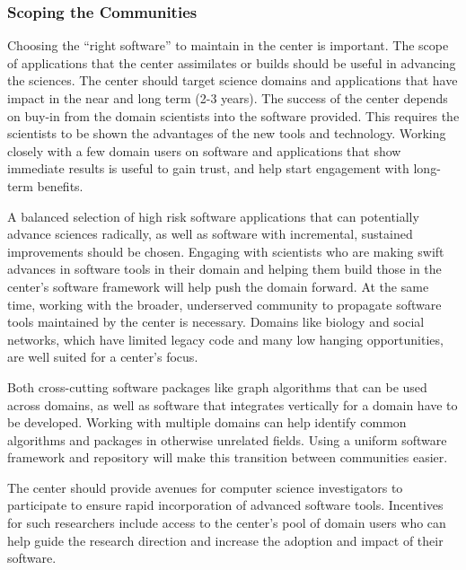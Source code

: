 \subsubsection{Scoping the Communities}
Choosing the “right software” to maintain in the center is important. The scope of applications that the center assimilates or builds should be useful in advancing the sciences. The center should target science domains and applications that have impact in the near and long term (2-3 years). The success of the center depends on buy-in from the domain scientists into the software provided. This requires the scientists to be shown the advantages of the new tools and technology. Working closely with a few domain users on software and applications that show immediate results is useful to gain trust, and help start engagement with long-term benefits.

A balanced selection of high risk software applications that can potentially advance sciences radically, as well as software with incremental, sustained improvements should be chosen. Engaging with scientists who are making swift advances in software tools in their domain and helping them build those in the center’s software framework will help push the domain forward. At the same time, working with the broader, underserved community to propagate software tools maintained by the center is necessary. Domains like biology and social networks, which have limited legacy code and many low hanging opportunities, are well suited for a center’s focus.

Both cross-cutting software packages like graph algorithms that can be used across domains, as well as software that integrates vertically for a domain have to be developed. Working with multiple domains can help identify common algorithms and packages in otherwise unrelated fields. Using a uniform software framework and repository will make this transition between communities easier.

The center should provide avenues for computer science investigators to participate to ensure rapid incorporation of advanced software tools. Incentives for such researchers include access to the center’s pool of domain users who can help guide the research direction and increase the adoption and impact of their software.
